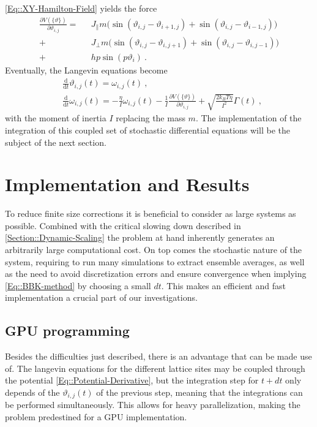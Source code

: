 	\autoref{Eq::XY-Hamilton-Field} yields the force
	\begin{equation} \label{Eq::Potential-Derivative}
		\begin{split}
			\frac{\partial V(\{\vartheta\})}{\partial \vartheta_{i, j}} = ~~~& J_\parallel m \Big( \sin \left(\vartheta_{i,j} - \vartheta_{i + 1, j} \right) +   \sin \left(\vartheta_{i,j} - \vartheta_{i-1, j} \right) \Big)	 \\
			+ &J_\perp m \Big( \sin \left(\vartheta_{i,j} - \vartheta_{i, j+1} \right) +  \sin \left(\vartheta_{i,j} - \vartheta_{i, j-1} \right) \Big) \\
			+ &h p \sin(p\vartheta_i)~.
		\end{split}
	\end{equation}
	Eventually, the Langevin equations become
	\begin{align}
		&\frac{\text{d}}{\text{d}t} \vartheta_{i,j}(t) =	 \omega_{i,j}(t)~, \label{Eq::Si-Langevin-theta} \\
		&\frac{\text{d}}{\text{d}t} \omega_{i,j}(t) =	- \frac{\eta}{I} \omega_{i,j}(t) - \frac{1}{I}\frac{\partial V(\{\vartheta\})}{\partial \vartheta_{i,j}} + \sqrt{\frac{2 k_B T \eta}{I^2}} \Gamma(t)~, \label{Eq::Si-Langevin-omega}
	\end{align}
	with the moment of inertia $I$ replacing the mass $m$. The implementation of the integration of this coupled set of stochastic differential equations will be the subject of the next section.
	\chapter{Implementation and Results} \label{Chapter::Implementation-Results}
	To reduce finite size corrections it is beneficial to consider as large systems as possible. Combined with the critical slowing down described in  \autoref{Section::Dynamic-Scaling} the problem at hand inherently generates an arbitrarily large computational cost. On top comes the stochastic nature of the system, requiring to run many simulations to extract ensemble averages, as well as the need to avoid discretization errors and ensure convergence when implying \autoref{Eq::BBK-method} by choosing a small $dt$. This makes an efficient and fast implementation a crucial part of our investigations.
	\section{GPU programming}
	Besides the difficulties just described, there is an advantage that can be made use of. The langevin equations for the different lattice sites may be coupled through the potential \autoref{Eq::Potential-Derivative}, but the integration step for $t + dt$ only depends of the $\vartheta_{i, j}(t)$ of the previous step, meaning that the integrations can be performed simultaneously. This allows for heavy parallelization, making the problem predestined for a GPU implementation. \\
	

